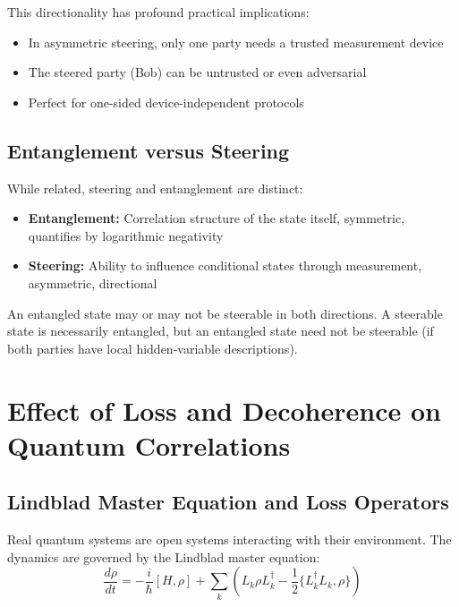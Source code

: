 This directionality has profound practical implications:
\begin{itemize}
	\item In asymmetric steering, only one party needs a trusted measurement device
	\item The steered party (Bob) can be untrusted or even adversarial
	\item Perfect for one-sided device-independent protocols
\end{itemize}

\subsection{Entanglement versus Steering}

While related, steering and entanglement are distinct:

\begin{itemize}
	\item \textbf{Entanglement:} Correlation structure of the state itself, symmetric, quantifies by logarithmic negativity
	\item \textbf{Steering:} Ability to influence conditional states through measurement, asymmetric, directional
\end{itemize}

An entangled state may or may not be steerable in both directions. A steerable state is necessarily entangled, but an entangled state need not be steerable (if both parties have local hidden-variable descriptions).

\section{Effect of Loss and Decoherence on Quantum Correlations}

\subsection{Lindblad Master Equation and Loss Operators}

Real quantum systems are open systems interacting with their environment. The dynamics are governed by the Lindblad master equation:
\begin{equation}
\frac{d\rho}{dt} = -\frac{i}{\hbar}[H, \rho] + \sum_k \left(L_k \rho L_k^\dagger - \frac{1}{2}\{L_k^\dagger L_k, \rho\}\right)
\end{equation}

